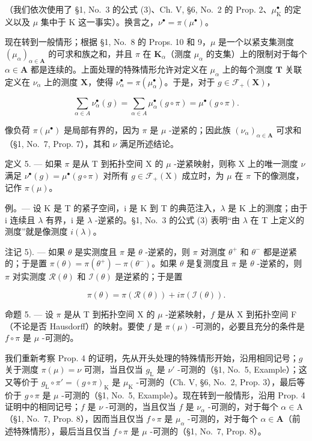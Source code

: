 （我们依次使用了 §1, No.~3 的公式 (3)、Ch. V, §6, No.~2 的 Prop. 2、\(\mu_{\mathrm{K}}^{\bullet}\) 的定义以及 \(\mu\) 集中于 K 这一事实）。换言之，\(\nu^{\bullet} = \pi(\mu^{\bullet})\)。

现在转到一般情形；根据 §1, No.~8 的 Props. 10 和 9，\(\mu\) 是一个以紧支集测度 \((\mu_{\alpha})_{\alpha \in \mathbf{A}}\) 的可求和族之和，并且 \(\pi\) 在 \(\mathbf{K}_{\alpha}\)（测度 \(\mu_{\alpha}\) 的支集）上的限制对于每个 \(\alpha \in \mathbf{A}\) 都是连续的。上面处理的特殊情形允许对定义在 \(\mu_{\alpha}\) 上的每个测度 \(\mathbf{T}\) 关联定义在 \(\nu_{\alpha}\) 上的测度 \(\mathbf{X}\)，使得 \(\nu_{\alpha}^{\bullet} = \pi (\mu_{\alpha}^{\bullet})\)。于是，对于 \(g \in \mathcal{F}_{+}(\mathbf{X})\)，

\[
\sum_ {\alpha \in A} \nu_ {\alpha} ^ {\bullet} (g) = \sum_ {\alpha \in A} \mu_ {\alpha} ^ {\bullet} (g \circ \pi) = \mu^ {\bullet} (g \circ \pi).
\]

像负荷 \(\pi (\mu^{\bullet})\) 是局部有界的，因为 \(\pi\) 是 \(\mu\) -逆紧的；因此族 \((\nu_{\alpha})_{\alpha \in \mathbf{A}}\) 可求和（§1, No.~7, Prop. 7），其和 \(\nu\) 满足所述结论。

定义 5. --- 如果 \(\pi\) 是从 T 到拓扑空间 X 的 \(\mu\) -逆紧映射，则称 X 上的唯一测度 \(\nu\) 满足 \(\nu^{\bullet}(g) = \mu^{\bullet}(g \circ \pi)\) 对所有 \(g \in \mathcal{F}_{+}(\mathrm{X})\) 成立时，为 \(\mu\) 在 \(\pi\) 下的像测度，记作 \(\pi(\mu)\)。

例。--- 设 K 是 T 的紧子空间，i 是 K 到 T 的典范注入，\(\lambda\) 是 K 上的测度；由于 i 连续且 \(\lambda\) 有界，i 是 \(\lambda\) -逆紧的。§1, No.~3 的公式 (3) 表明“由 \(\lambda\) 在 T 上定义的测度”就是像测度 \(i(\lambda)\)。

注记 5). --- 如果 \(\theta\) 是实测度且 \(\pi\) 是 \(\theta\) -逆紧的，则 \(\pi\) 对测度 \(\theta^{+}\) 和 \(\theta^{-}\) 都是逆紧的；于是置 \(\pi(\theta) = \pi(\theta^{+}) - \pi(\theta^{-})\)。如果 \(\theta\) 是复测度且 \(\pi\) 是 \(\theta\) -逆紧的，则 \(\pi\) 对实测度 \(\mathcal{R}(\theta)\) 和 \(\mathcal{I}(\theta)\) 是逆紧的；于是置

\[
\pi (\theta) = \pi (\mathcal {R} (\theta)) + i \pi (\mathcal {I} (\theta)).
\]

命题 5. --- 设 \(\pi\) 是从 T 到拓扑空间 X 的 \(\mu\) -逆紧映射，\(f\) 是从 X 到拓扑空间 F（不论是否 Hausdorff）的映射。要使 \(f\) 是 \(\pi(\mu)\) -可测的，必要且充分的条件是 \(f \circ \pi\) 是 \(\mu\) -可测的。

我们重新考察 Prop. 4 的证明，先从开头处理的特殊情形开始，沿用相同记号；\(g\) 关于测度 \(\pi(\mu) = \nu\) 可测，当且仅当 \(g_{\mathrm{L}}\) 是 \(\nu'\) -可测的（§1, No.~5, Example）；这又等价于 \(g_{\mathrm{L}} \circ \pi' = (g \circ \pi)_{\mathrm{K}}\) 是 \(\mu_{\mathrm{K}}\) -可测的（Ch. V, §6, No.~2, Prop. 3），最后等价于 \(g \circ \pi\) 是 \(\mu\) -可测的（§1, No.~5, Example）。现在转到一般情形，沿用 Prop. 4 证明中的相同记号；\(f\) 是 \(\nu\) -可测的，当且仅当 \(f\) 是 \(\nu_{\alpha}\) -可测的，对于每个 \(\alpha \in \mathrm{A}\)（§1, No.~7, Prop. 8），因而当且仅当 \(f \circ \pi\) 是 \(\mu_{\alpha}\) -可测的，对于每个 \(\alpha \in \mathbf{A}\)（前述特殊情形），最后当且仅当 \(f \circ \pi\) 是 \(\mu\) -可测的（§1, No.~7, Prop. 8）。

